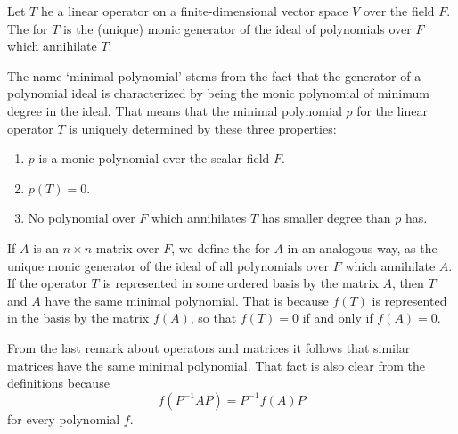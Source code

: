 \begin{definition}
    Let \(T\) he a linear operator on a finite-dimensional vector space \(V\) over the field \(F\). The  for \(T\) is the (unique) monic generator of the ideal of polynomials over \(F\) which annihilate \(T\).
\end{definition}

The name `minimal polynomial' stems from the fact that the generator of a polynomial ideal is characterized by being the monic polynomial of minimum degree in the ideal. That means that the minimal polynomial \(p\) for the linear operator \(T\) is uniquely determined by these three properties:
\begin{enumerate}
    \item \(p\) is a monic polynomial over the scalar field \(F\).
    \item \(p\left(T\right)=0\).
    \item No polynomial over \(F\) which annihilates \(T\) has smaller degree than \(p\) has.
\end{enumerate}

If \(A\) is an \(n\times n\) matrix over \(F\), we define the  for \(A\) in an analogous way, as the unique monic generator of the ideal of all polynomials over \(F\) which annihilate \(A\). If the operator \(T\) is represented in some ordered basis by the matrix \(A\), then \(T\) and \(A\) have the same minimal polynomial. That is because \(f\left(T\right)\) is represented in the basis by the matrix \(f\left(A\right)\), so that \(f\left(T\right)=0\) if and only if \(f\left(A\right)=0\).

From the last remark about operators and matrices it follows that similar matrices have the same minimal polynomial. That fact is also clear from the definitions because
\begin{equation*}
    f\left(P^{-1}AP\right)=P^{-1}f\left(A\right)P
\end{equation*}
for every polynomial \(f\).

